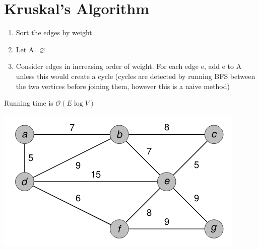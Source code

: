 \documentclass{article}[18pt]
\begin{document}
\section{Kruskal's Algorithm}
\begin{enumerate}
	\item Sort the edges by weight
	\item Let A=$\varnothing$
	\item Consider edges in increasing order of weight. For each edge e, add e to A unless this would create a cycle (cycles are detected by running BFS between the two vertices before joining them, however this is a naive method)
\end{enumerate}
Running time is $\mathcal{O}(E\log V)$
\begin{center}
	\includegraphics[scale=0.7]{graph3}
\end{center}
\end{document}
